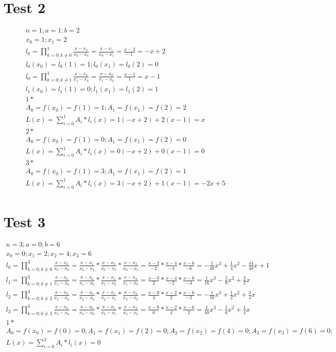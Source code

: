 \documentclass[12pt,a4paper, fleqn]{article}
\theoremstyle{definition}
\begin{document}
\section{Test 2}
\begin{displaymath} 
\begin{split}
n=1; a=1; b=2\\
x_0=1; x_1=2\\
l_0=\prod\limits_{k=0;k\neq0}^1\frac{x-x_k}{x_0-x_k}=\frac{x-x_1}{x_0-x_1}=\frac{x-2}{-1}=-x+2\\
l_0(x_0)=l_0(1)=1; l_0(x_1)=l_0(2)=0\\
l_0=\prod\limits_{k=0;k\neq1}^1\frac{x-x_k}{x_1-x_k}=\frac{x-x_0}{x_1-x_0}=\frac{x-1}{1}=x-1\\
l_1(x_0)=l_1(1)=0; l_1(x_1)=l_1(2)=1\\
1*\\
A_0=f(x_0)=f(1)=1; A_1=f(x_1)=f(2)=2\\
L(x)=\sum\limits_{i=0}^1A_i*l_i(x)=1(-x+2)+2(x-1)=x\\
2*\\
A_0=f(x_0)=f(1)=0; A_1=f(x_1)=f(2)=0\\
L(x)=\sum\limits_{i=0}^1A_i*l_i(x)=0(-x+2)+0(x-1)=0\\
3*\\
A_0=f(x_0)=f(1)=3; A_1=f(x_1)=f(2)=1\\
L(x)=\sum\limits_{i=0}^1A_i*l_i(x)=3(-x+2)+1(x-1)=-2x+5\\
\end{split}
\end{displaymath}
\section{Test 3}
\begin{displaymath} 
\begin{split}
n=3; a=0; b=6\\
x_0=0; x_1=2; x_2=4; x_3=6\\
l_0=\prod\limits_{k=0;k\neq0}^3\frac{x-x_k}{x_0-x_k}=\frac{x-x_1}{x_0-x_1}*\frac{x-x_2}{x_0-x_2}*\frac{x-x_3}{x_0-x_3}=\frac{x-2}{-2}*\frac{x-4}{-4}*\frac{x-6}{-6}=-\frac{1}{48}x^3+\frac{1}{4}x^2-\frac{44}{48}x+1\\
l_1=\prod\limits_{k=0;k\neq1}^3\frac{x-x_k}{x_1-x_k}=\frac{x-x_0}{x_1-x_0}*\frac{x-x_2}{x_1-x_2}*\frac{x-x_3}{x_1-x_3}=\frac{x-0}{2}*\frac{x-4}{-2}*\frac{x-6}{-4}=\frac{1}{16}x^3-\frac{5}{8}x^2+\frac{3}{2}x\\
l_2=\prod\limits_{k=0;k\neq2}^3\frac{x-x_k}{x_2-x_k}=\frac{x-x_0}{x_2-x_0}*\frac{x-x_1}{x_2-x_1}*\frac{x-x_3}{x_2-x_3}=\frac{x-0}{4}*\frac{x-2}{2}*\frac{x-6}{-2}=-\frac{1}{16}x^3+\frac{1}{2}x^2+\frac{3}{4}x\\
l_3=\prod\limits_{k=0;k\neq3}^3\frac{x-x_k}{x_3-x_k}=\frac{x-x_0}{x_3-x_0}*\frac{x-x_1}{x_3-x_1}*\frac{x-x_2}{x_3-x_2}=\frac{x-0}{6}*\frac{x-2}{4}*\frac{x-6}{2}=\frac{1}{48}x^3-\frac{1}{6}x^2+\frac{1}{4}x\\
1*\\
A_0=f(x_0)=f(0)=0; A_1=f(x_1)=f(2)=0; A_2=f(x_2)=f(4)=0; A_3=f(x_3)=f(6)=0; \\
L(x)=\sum\limits_{i=0}^3A_i*l_i(x)=0\\
\end{split}
\end{displaymath}
\end{document}
